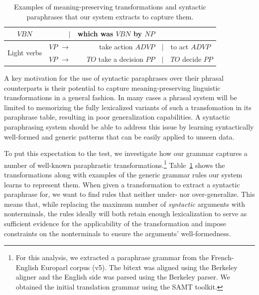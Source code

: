 \documentclass[11pt]{article}
\begin{document}
\begin{table}[!ht]
\begin{center}
\begin{tabular}{|c|rrcl|}
    $\mathit{VBN}$ & $\mid$ & which was $\mathit{VBN}$ by $\mathit{NP}$ \\
    \hline
    \multirow{2}{*}{Light verbs} & $\mathit{VP}$ $\rightarrow$ & take action $\mathit{ADVP}$ &
    $\mid$ & to act $\mathit{ADVP}$ \\
    & $\mathit{VP}$ $\rightarrow$ & $\mathit{TO}$ take a decision $\mathit{PP}$ &
    $\mid$ & $\mathit{TO}$ decide $\mathit{PP}$ \\
    \hline
\end{tabular}
\end{center}
\caption{Examples of meaning-preserving transformations and syntactic
  paraphrases that our system extracts to capture them.}
\label{example_rules}
\end{table}


A key motivation for the use of syntactic paraphrases over their
phrasal counterparts is their potential to capture meaning-preserving
linguistic transformations in a general fashion. In many cases a
phrasal system will be limited to memorizing the fully lexicalized
variants of such a transfomation in its paraphrase table, resulting in
poor generalization capabilities. A syntactic paraphrasing system
should be able to address this issue by learning syntactically
well-formed and generic patterns that can be easily applied to unseen
data.

To put this expectation to the test, we investigate how our grammar
captures a number of well-known paraphrastic
transformations.\footnote{For this analysis, we extracted a paraphrase grammar from the French-English Europarl corpus (v5). The bitext was aligned using the Berkeley aligner and the English side was parsed using the Berkeley parser. We obtained the initial translation grammar using the SAMT toolkit. }
Table~\ref{example_rules} shows the transformations
along with examples of the generic grammar rules our system learns to
represent them. When given a transformation to extract a syntactic
paraphrase for, we want to find rules that neither under- nor
over-generalize. This means that, while replacing the maximum number
of \emph{syntactic} arguments with nonterminals, the rules ideally
will both retain enough lexicalization to serve as sufficient evidence
for the applicability of the transformation and impose constraints on
the nonterminals to ensure the arguments' well-formedness.
\end{document}
